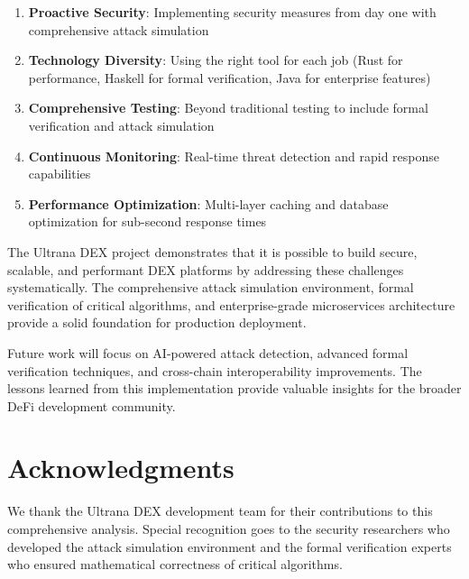 \documentclass[11pt,a4paper]{article}
\begin{document}
\begin{enumerate}
\item \textbf{Proactive Security}: Implementing security measures from day one with comprehensive attack simulation
\item \textbf{Technology Diversity}: Using the right tool for each job (Rust for performance, Haskell for formal verification, Java for enterprise features)
\item \textbf{Comprehensive Testing}: Beyond traditional testing to include formal verification and attack simulation
\item \textbf{Continuous Monitoring}: Real-time threat detection and rapid response capabilities
\item \textbf{Performance Optimization}: Multi-layer caching and database optimization for sub-second response times
\end{enumerate}

The Ultrana DEX project demonstrates that it is possible to build secure, scalable, and performant DEX platforms by addressing these challenges systematically. The comprehensive attack simulation environment, formal verification of critical algorithms, and enterprise-grade microservices architecture provide a solid foundation for production deployment.

Future work will focus on AI-powered attack detection, advanced formal verification techniques, and cross-chain interoperability improvements. The lessons learned from this implementation provide valuable insights for the broader DeFi development community.

\section{Acknowledgments}

We thank the Ultrana DEX development team for their contributions to this comprehensive analysis. Special recognition goes to the security researchers who developed the attack simulation environment and the formal verification experts who ensured mathematical correctness of critical algorithms.

\end{document}
